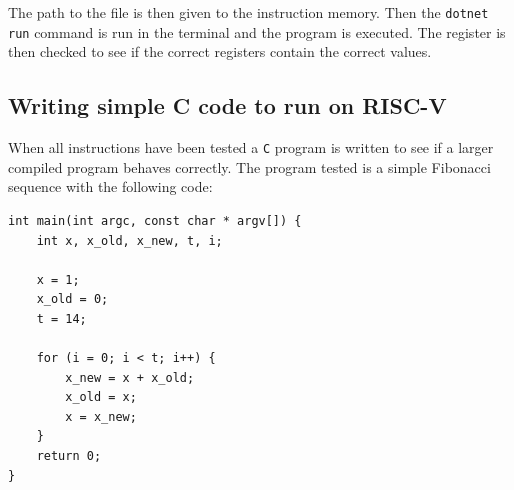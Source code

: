     The path to the file is then given to the instruction memory. Then the \texttt{dotnet run} command is run in the terminal and the program is executed. The register is then checked to see if the correct registers contain the correct values.
    
    \subsection{Writing simple C code to run on RISC-V}
        When all instructions have been tested a \texttt{C} program is written to see if a larger compiled program behaves correctly. The program tested is a simple Fibonacci sequence with the following code:
        

            \begin{lstlisting}[language={[Sharp]C}]
int main(int argc, const char * argv[]) {
    int x, x_old, x_new, t, i;
    
    x = 1;
    x_old = 0;
    t = 14;
    
    for (i = 0; i < t; i++) {
        x_new = x + x_old;
        x_old = x;
        x = x_new;
    }
    return 0;
}
            \end{lstlisting}

